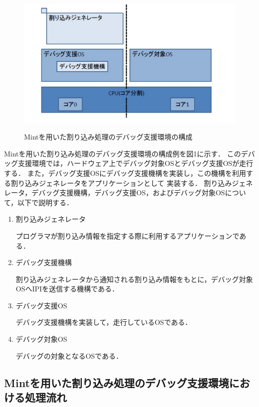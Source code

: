 \documentclass[12pt]{jsarticle}
\begin{document}
\begin{figure}[t]
\begin{center}
\includegraphics[height=7.0cm]{./fig2.jpg}          
\caption{Mintを用いた割り込み処理のデバッグ支援環境の構成}
\label{fig:2}
\end{center}
\end{figure}



Mintを用いた割り込み処理のデバッグ支援環境の構成例を図1に示す．
このデバッグ支援環境では，ハードウェア上でデバッグ対象OSとデバッグ支援OSが走行する．
また，デバッグ支援OSにデバッグ支援機構を実装し，この機構を利用する割り込みジェネレータをアプリケーションとして
実装する．
割り込みジェネレータ，デバッグ支援機構，デバッグ支援OS，およびデバッグ対象OSについて，以下で説明する．
\begin{enumerate}
\item 割り込みジェネレータ

プログラマが割り込み情報を指定する際に利用するアプリケーションである．

\item デバッグ支援機構

割り込みジェネレータから通知される割り込み情報をもとに，デバッグ対象OSへIPIを送信する機構である．
\item デバッグ支援OS

デバッグ支援機構を実装して，走行しているOSである．
\item デバッグ対象OS

デバッグの対象となるOSである．
\end{enumerate}
\subsection{Mintを用いた割り込み処理のデバッグ支援環境における処理流れ}
\end{document}
